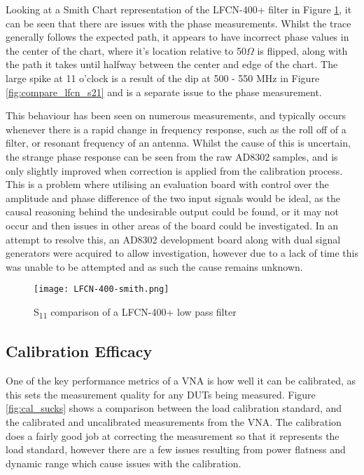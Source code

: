Looking at a Smith Chart representation of the LFCN-400+ filter in Figure \ref{fig:compare_lfcn_smith}, it can be seen that there are issues with the phase measurements. Whilst the trace generally follows the expected path, it appears to have incorrect phase values in the center of the chart, where it's location relative to 50$\Omega$ is flipped, along with the path it takes until halfway between the center and edge of the chart. The large spike at 11 o'clock is a result of the dip at 500 - 550 MHz in Figure \ref{fig:compare_lfcn_s21} and is a separate issue to the phase measurement. 

This behaviour has been seen on numerous measurements, and typically occurs whenever there is a rapid change in frequency response, such as the roll off of a filter, or resonant frequency of an antenna. Whilst the cause of this is uncertain, the strange phase response can be seen from the raw AD8302 samples, and is only slightly improved when correction is applied from the calibration process. This is a problem where utilising an evaluation board with control over the amplitude and phase difference of the two input signals would be ideal, as the causal reasoning behind the undesirable output could be found, or it may not occur and then issues in other areas of the board could be investigated. In an attempt to resolve this, an AD8302 development board along with dual signal generators were acquired to allow investigation, however due to a lack of time this was unable to be attempted and as such the cause remains unknown. 

\begin{figure}[H]
	\centering
	\texttt{[image: LFCN-400-smith.png]}
	\caption{S\textsubscript{11} comparison of a LFCN-400+ low pass filter}
	\label{fig:compare_lfcn_smith}
\end{figure}

\subsection{Calibration Efficacy}
One of the key performance metrics of a VNA is how well it can be calibrated, as this sets the measurement quality for any DUTs being measured. Figure \ref{fig:cal_sucks} shows a comparison between the load calibration standard, and the calibrated and uncalibrated measurements from the VNA. The calibration does a fairly good job at correcting the measurement so that it represents the load standard, however there are a few issues resulting from power flatness and dynamic range which cause issues with the calibration. 

